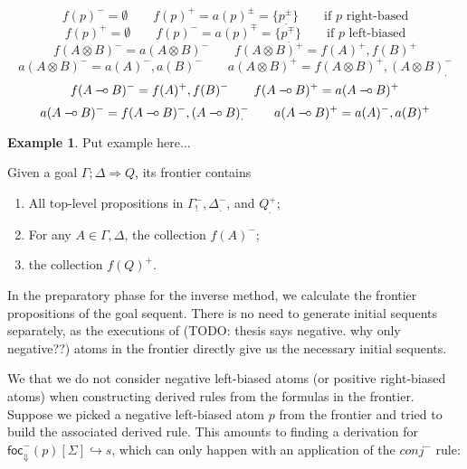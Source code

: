 \documentclass{article}
\theoremstyle{definition}
\newtheorem{example}{Example}
\def\limp {\mathbin{{-}\mkern-3.5mu{\circ}}}
\newcommand{\flfrel}[1]{\textsf{foc}^-_{\Downarrow}(#1)}
\newcommand{\relj}[3]{#1 [#2] \hookrightarrow #3}
\newcommand{\decplus}[1]{#1^+}
\newcommand{\decminus}[1]{#1^-}
\newcommand{\declinear}[1]{#1_.}
\newcommand{\decunrestr}[1]{#1_!}
\newcommand{\decpluslinear}[1]{\decplus{\declinear{#1}}}
\newcommand{\decminuslinear}[1]{\decminus{\declinear{#1}}}
\newcommand{\decplusminus}[1]{#1^{\pm}}
\newcommand{\decminusplus}[1]{#1^{\mp}}
\begin{document}
\[
  \decminus{f(p)} = \emptyset \qquad
  \decplus{f(p)} = \decplusminus{a(p)} = \{
  \decplusminus{\declinear{p}} \} \qquad \text{if $p$ right-based}
\]
\[
  \decplus{f(p)} = \emptyset \qquad
  \decminus{f(p)} = \decminusplus{a(p)} = \{
  \decminusplus{\declinear{p}} \} \qquad \text{if $p$ left-biased}
\]
\[
  \decminus{f(A \otimes B)} = \decminus{a(A \otimes B)} \qquad
  \decplus{f(A \otimes B)} = \decplus{f(A)}, \decplus{f(B)}
\]
\[
  \decminus{a(A\otimes B)} = \decminus{a(A)}, \decminus{a(B)} \qquad
  \decplus{a(A\otimes B)} = \decplus{f(A \otimes B)}, \decminuslinear{(A \otimes B)}
\]
\[
  \decminus{f(A \limp B)} = \decplus{f(A)}, \decminus{f(B)} \qquad
  \decplus{f(A \limp B)} = \decplus{a(A \limp B)}
\]
\[
  \decminus{a(A \limp B)} = \decminus{f(A \limp B)}, \decminuslinear{(A \limp
    B)}
  \qquad
  \decplus{a(A\limp B)} = \decminus{a(A)}, \decplus{a(B)}
\]

\begin{example}
  Put example here...
\end{example}

\begin{definition}[Frontier]
  Given a goal $\Gamma;\Delta \Longrightarrow Q$, its frontier contains

  \begin{enumerate}
  \item All top-level propositions in $\decunrestr{\decminus{\Gamma}},
    \decminuslinear{\Delta}$, and $\decpluslinear{Q}$;
  \item For any $A \in \Gamma, \Delta$, the collection $\decminus{f(A)}$;
  \item the collection $\decplus{f(Q)}$.
  \end{enumerate}
\end{definition}

In the preparatory phase for the inverse method, we calculate the frontier
propositions of the goal sequent. There is no need to generate initial sequents
separately, as the executions of (TODO: thesis says negative. why only
negative??) atoms in the frontier directly give us the necessary initial
sequents.

We that we do not consider negative left-biased atoms (or positive right-biased
atoms) when constructing derived rules from the formulas in the
frontier. Suppose we picked a negative left-biased atom $p$ from the frontier
and tried to build the associated derived rule. This amounts to finding a
derivation for $\relj{\flfrel{p}}{\Sigma}{s}$, which can only happen with an
application of the $conj^-$ rule:
\end{document}
